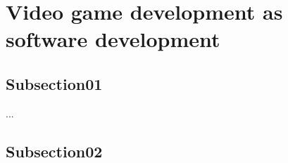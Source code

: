 \section{Video game development as software development} \label{game-development-sw}
    \subsection{Subsection01}
    ...

    \subsection{Subsection02}
